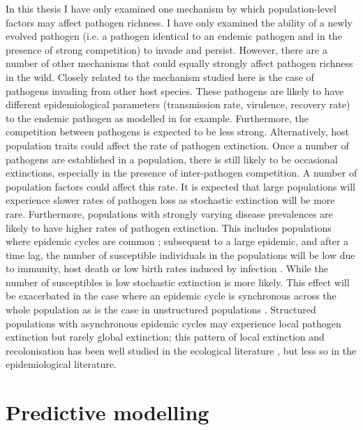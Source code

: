 In this thesis I have only examined one mechanism by which population-level factors may affect pathogen richness.
I have only examined the ability of a newly evolved pathogen (i.e. a pathogen identical to an endemic pathogen and in the presence of strong competition) to invade and persist.
However, there are a number of other mechanisms that could equally strongly affect pathogen richness in the wild.
Closely related to the mechanism studied here is the case of pathogens invading from other host species.
These pathogens are likely to have different epidemiological parameters (transmission rate, virulence, recovery rate) to the endemic pathogen as modelled in \textcite{may1994superinfection} for example.
Furthermore, the competition between pathogens is expected to be less strong.
Alternatively, host population traits could affect the rate of pathogen extinction.
Once a number of pathogens are established in a population, there is still likely to be occasional extinctions, especially in the presence of inter-pathogen competition. %
A number of population factors could affect this rate.
It is expected that large populations will experience slower rates of pathogen loss as stochastic extinction will be more rare.
Furthermore, populations with strongly varying disease prevalences are likely to have higher rates of pathogen extinction.
This includes populations where epidemic cycles are common \cite{altizer2006sesonality}; subsequent to a large epidemic, and after a time lag, the number of susceptible individuals in the populations will be low due to immunity, host death or low birth rates induced by infection \cite{scott1987population, hethcote1994thousand}.
While the number of susceptibles is low stochastic extinction is more likely. %
This effect will be exacerbated in the case where an epidemic cycle is synchronous across the whole population as is the case in unstructured populations \cite{duke2011strong, mckenzie2001seasonality}.
Structured populations with asynchronous epidemic cycles may experience local pathogen extinction but rarely global extinction; this pattern of local extinction and recolonisation has been well studied in the ecological literature \cite{grenfell1995seasonality, levin1974dispersion, hanski1998metapopulation}, but less so in the epidemiological literature. %


\section{Predictive modelling}

